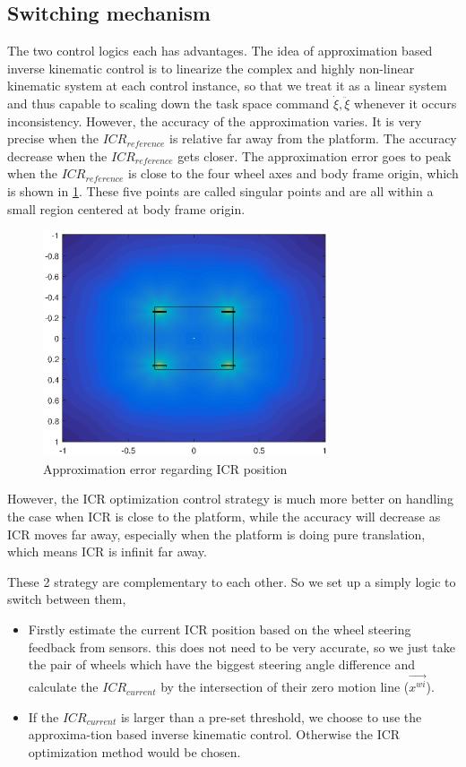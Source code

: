 \subsection{Switching mechanism}
\label{subsec:switching}
The two control logics each has advantages. 
The idea of approximation based inverse kinematic control is to linearize the complex and highly non-linear kinematic system at each control instance, so that we treat it as a linear system and thus capable to scaling down the task space command $\dot{\xi}, \ddot{\xi}$ whenever it occurs inconsistency. However, the accuracy of the approximation varies. It is very precise when the $ICR_{reference}$ is relative far away from the platform. The accuracy decrease when the  $ICR_{reference}$ gets closer. The approximation error goes to peak when the $ICR_{reference}$ is close to the four wheel axes and body frame origin, which is shown in \cref{fig:approximationError}. These five points are called singular points and are all within a small region centered at body frame origin. 
\begin{figure}[!ht]
    \centering
    \includegraphics[width=0.75\textwidth]{Figures/approximationError.eps}
    \caption{Approximation error regarding ICR position}
    \label{fig:approximationError}
\end{figure}
However, the ICR optimization control strategy is much more better on handling the case when ICR is close to the platform, while the accuracy will decrease as ICR moves far away, especially when the platform is doing pure translation, which means ICR is infinit far away.

These 2 strategy are complementary to each other. So we set up a simply logic to switch between them, 
\begin{itemize}
    \item[1.] Firstly estimate the current ICR position based on the wheel steering feedback from sensors. this does not need to be very accurate, so we just take the pair of wheels which have the biggest steering angle difference and calculate the $ICR_{current}$ by the intersection of their zero motion line ($\overrightarrow{x^{wi}}$).
    \item[2.] If the $ICR_{current}$ is larger than a pre-set threshold, we choose to use the approxima-tion based inverse kinematic control. Otherwise the ICR optimization method would be chosen.
\end{itemize}